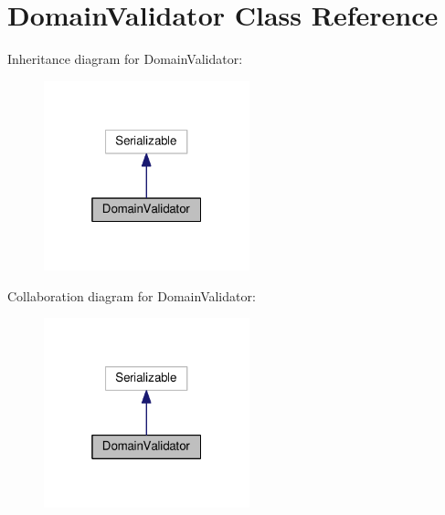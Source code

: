 \hypertarget{classDomainValidator}{}\section{Domain\+Validator Class Reference}
\label{classDomainValidator}


Inheritance diagram for Domain\+Validator\+:
\nopagebreak
\begin{figure}[H]
\begin{center}
\leavevmode
\includegraphics[width=169pt]{classDomainValidator__inherit__graph}
\end{center}
\end{figure}


Collaboration diagram for Domain\+Validator\+:
\nopagebreak
\begin{figure}[H]
\begin{center}
\leavevmode
\includegraphics[width=169pt]{classDomainValidator__coll__graph}
\end{center}
\end{figure}
